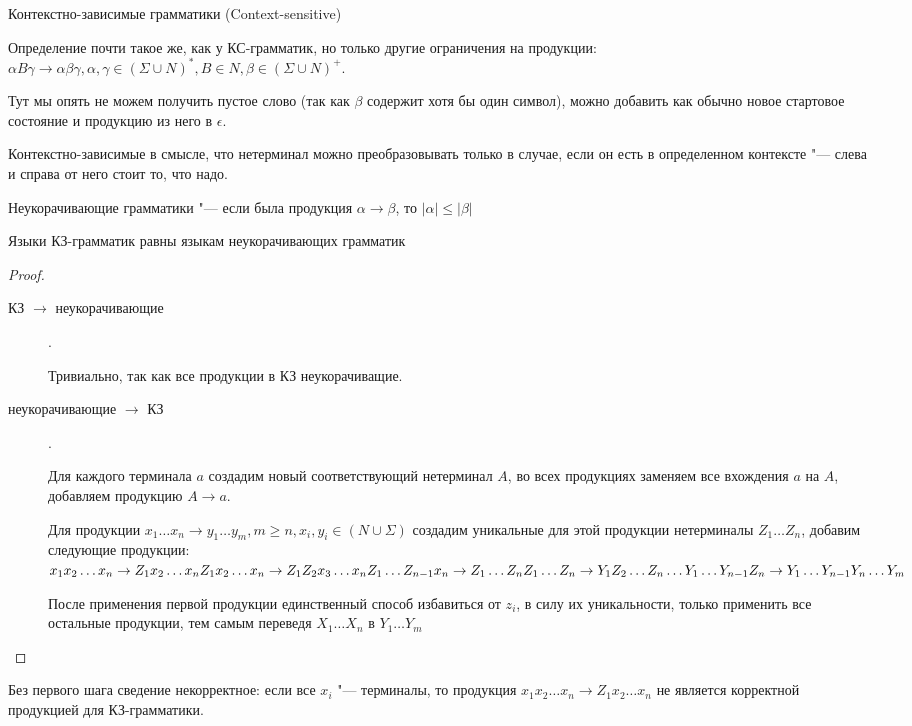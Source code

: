 \begin{Def}
Контекстно-зависимые грамматики (Context-sensitive)

Определение почти такое же, как у КС-грамматик, но только другие ограничения на продукции:
$\alpha B \gamma \to \alpha \beta \gamma, \alpha, \gamma \in (\Sigma \cup N)^*, B \in N, \beta \in (\Sigma \cup N)^+$. 

Тут мы опять не можем получить пустое слово (так как $\beta$ содержит хотя бы один символ), можно добавить как обычно новое стартовое состояние и продукцию из него в $\epsilon$.
\end{Def}
\begin{Rem}
Контекстно-зависимые в смысле, что нетерминал можно преобразовывать только в случае, если он есть в определенном контексте "--- слева и справа от него стоит то, что надо.
\end{Rem}
\begin{Def}
Неукорачивающие грамматики "--- если была продукция $\alpha \to \beta$, то $|\alpha| \leq |\beta|$
\end{Def}
\begin{theorem}
Языки КЗ-грамматик равны языкам неукорачивающих грамматик
\end{theorem}
\begin{proof}
\begin{description}
\item[КЗ $\to$ неукорачивающие]. 

Тривиально, так как все продукции в КЗ неукорачиващие.

\item[неукорачивающие $\to$ КЗ].

Для каждого терминала $a$ создадим новый соответствующий нетерминал $A$, во всех продукциях заменяем все вхождения $a$ на $A$, добавляем продукцию $A \to a$.

Для продукции $x_1 \dots x_n \to y_1 \dots y_m, m \geq n, x_i, y_i \in (N \cup \Sigma)$ создадим уникальные для этой продукции нетерминалы $Z_1 \dots Z_n$, добавим следующие продукции:
$\\
x_1 x_2 \dots x_n \to Z_1 x_2 \dots x_n \\
Z_1 x_2 \dots x_n \to Z_1 Z_2 x_3 \dots x_n \\
Z_1 \dots Z_{n - 1} x_n \to Z_1 \dots Z_n \\
Z_1 \dots Z_n \to Y_1 Z_2 \dots Z_n \\
\dots \\
Y_1 \dots Y_{n - 1} Z_n \to Y_1 \dots Y_{n - 1} Y_n \dots Y_m$

После применения первой продукции единственный способ избавиться от $z_i$, в силу их уникальности, только применить все остальные продукции, 
тем самым переведя $X_1 \dots X_n$ в $Y_1 \dots Y_m$
\end{description}
\end{proof}
\begin{Rem}
Без первого шага сведение некорректное: если все $x_i$ "--- терминалы, то продукция $x_1 x_2 \dots x_n \to Z_1 x_2 \dots x_n$ не является корректной продукцией для КЗ-грамматики.
\end{Rem}

